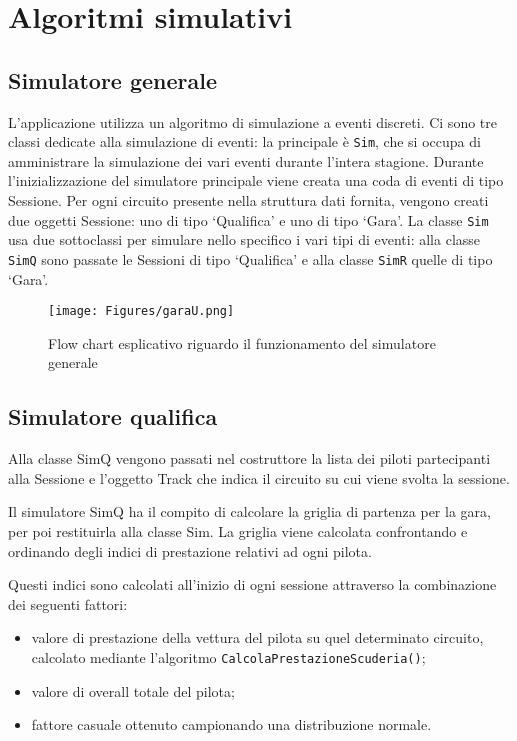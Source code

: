 \section{Algoritmi simulativi}

\subsection{Simulatore generale}
L’applicazione utilizza un algoritmo di simulazione a eventi discreti. Ci sono tre classi dedicate alla simulazione di eventi: la principale è \texttt{Sim}, che si occupa di amministrare la simulazione dei vari eventi durante l’intera stagione. Durante l’inizializzazione del simulatore principale viene creata una coda di eventi di tipo Sessione. Per ogni circuito presente nella struttura dati fornita, vengono creati due oggetti Sessione: uno di tipo ‘Qualifica’ e uno di tipo ‘Gara’. La classe \texttt{Sim} usa due sottoclassi per simulare nello specifico i vari tipi di eventi: alla classe \texttt{SimQ} sono passate le Sessioni di tipo ‘Qualifica’ e alla classe \texttt{SimR} quelle di tipo ‘Gara’.
\\[3ex]

\begin{figure}[h!]
    \centering
    \texttt{[image: Figures/garaU.png]}
    \caption{Flow chart esplicativo riguardo il funzionamento del simulatore generale}
    \label{fig:flowchart_simulatore_generale}
\end{figure}
\newpage
\subsection{Simulatore qualifica}
Alla classe SimQ vengono passati nel costruttore la lista dei piloti partecipanti alla Sessione e l’oggetto Track che indica il circuito su cui viene svolta la sessione.

Il simulatore SimQ ha il compito di calcolare la griglia di partenza per la gara, per poi restituirla alla classe Sim. La griglia viene calcolata confrontando e ordinando degli indici di prestazione relativi ad ogni pilota.

Questi indici sono calcolati all’inizio di ogni sessione attraverso la combinazione dei seguenti fattori:
\begin{itemize}
    \item valore di prestazione della vettura del pilota su quel determinato circuito, calcolato mediante l’algoritmo \texttt{CalcolaPrestazioneScuderia()};
    \item valore di overall totale del pilota;
    \item fattore casuale ottenuto campionando una distribuzione normale.
\end{itemize}

